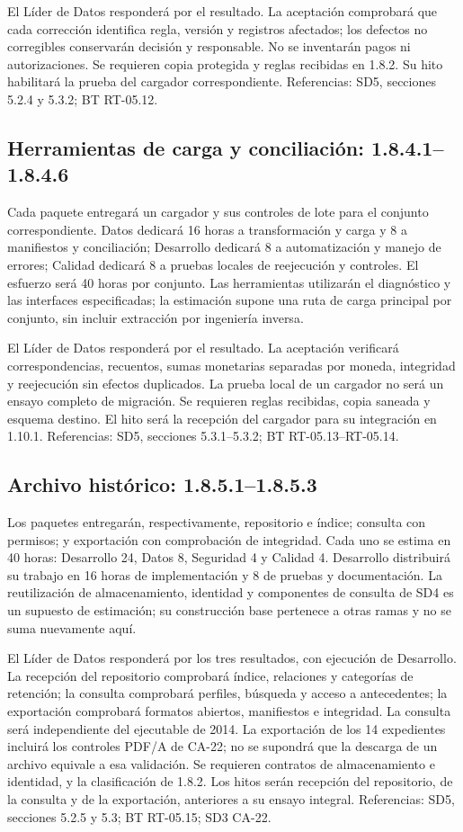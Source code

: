 El Líder de Datos responderá por el resultado. La aceptación comprobará que cada corrección identifica regla, versión y registros afectados; los defectos no corregibles conservarán decisión y responsable. No se inventarán pagos ni autorizaciones. Se requieren copia protegida y reglas recibidas en 1.8.2. Su hito habilitará la prueba del cargador correspondiente. Referencias: SD5, secciones 5.2.4 y 5.3.2; BT RT-05.12.

\subsection{Herramientas de carga y conciliación: 1.8.4.1--1.8.4.6}
Cada paquete entregará un cargador y sus controles de lote para el conjunto correspondiente. Datos dedicará 16 horas a transformación y carga y 8 a manifiestos y conciliación; Desarrollo dedicará 8 a automatización y manejo de errores; Calidad dedicará 8 a pruebas locales de reejecución y controles. El esfuerzo será 40 horas por conjunto. Las herramientas utilizarán el diagnóstico y las interfaces especificadas; la estimación supone una ruta de carga principal por conjunto, sin incluir extracción por ingeniería inversa.

El Líder de Datos responderá por el resultado. La aceptación verificará correspondencias, recuentos, sumas monetarias separadas por moneda, integridad y reejecución sin efectos duplicados. La prueba local de un cargador no será un ensayo completo de migración. Se requieren reglas recibidas, copia saneada y esquema destino. El hito será la recepción del cargador para su integración en 1.10.1. Referencias: SD5, secciones 5.3.1--5.3.2; BT RT-05.13--RT-05.14.

\subsection{Archivo histórico: 1.8.5.1--1.8.5.3}
Los paquetes entregarán, respectivamente, repositorio e índice; consulta con permisos; y exportación con comprobación de integridad. Cada uno se estima en 40 horas: Desarrollo 24, Datos 8, Seguridad 4 y Calidad 4. Desarrollo distribuirá su trabajo en 16 horas de implementación y 8 de pruebas y documentación. La reutilización de almacenamiento, identidad y componentes de consulta de SD4 es un supuesto de estimación; su construcción base pertenece a otras ramas y no se suma nuevamente aquí.

El Líder de Datos responderá por los tres resultados, con ejecución de Desarrollo. La recepción del repositorio comprobará índice, relaciones y categorías de retención; la consulta comprobará perfiles, búsqueda y acceso a antecedentes; la exportación comprobará formatos abiertos, manifiestos e integridad. La consulta será independiente del ejecutable de 2014. La exportación de los 14 expedientes incluirá los controles PDF/A de CA-22; no se supondrá que la descarga de un archivo equivale a esa validación. Se requieren contratos de almacenamiento e identidad, y la clasificación de 1.8.2. Los hitos serán recepción del repositorio, de la consulta y de la exportación, anteriores a su ensayo integral. Referencias: SD5, secciones 5.2.5 y 5.3; BT RT-05.15; SD3 CA-22.


